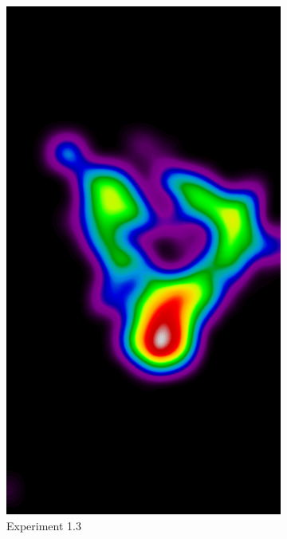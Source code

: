 \begin{figure}[h!]
\begin{subfigure}{0.195\textwidth}
        	\includegraphics[width=\textwidth]{plots/examples/example5_probs_1_3.png}
		\caption{Experiment 1.3}
    \end{subfigure}
	\begin{subfigure}{0.195\textwidth}
		\centering

\end{subfigure}
\end{figure}
